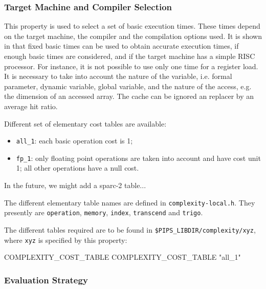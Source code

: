 \documentclass[a4paper]{report}
\begin{document}
\subsubsection{Target Machine and Compiler Selection}

This property is used to select a set of basic execution times. These
times depend on the target machine, the compiler and the compilation
options used. It is shown in \cite{Zho94} that fixed basic times can be
used to obtain accurate execution times, if enough basic times are
considered, and if the target machine has a simple RISC processor. For
instance, it is not possible to use only one time for a register
load. It is necessary to take into account the nature of the variable,
i.e. formal parameter, dynamic variable, global variable, and the nature
of the access, e.g. the dimension of an accessed array. The cache can be
ignored an replacer by an average hit ratio.

Different set of elementary cost tables are available:

\begin{itemize}

  \item \verb+all_1+: each basic operation cost is 1;

  \item \verb+fp_1+: only floating point operations are taken into
account and have cost unit 1; all other operations have a null cost.

\end{itemize}

In the future, we might add a sparc-2 table...

The different elementary table names are defined in
\verb+complexity-local.h+. They presently are \verb+operation+,
\verb+memory+, \verb+index+, \verb+transcend+
and \verb+trigo+.

The different tables required are to be found in
\verb+$PIPS_LIBDIR/complexity/xyz+,
where \verb+xyz+ is specified by this property:

\begin{PipsProp}{COMPLEXITY_COST_TABLE}
COMPLEXITY_COST_TABLE "all_1"
\end{PipsProp}

\subsubsection{Evaluation Strategy}
\end{document}
